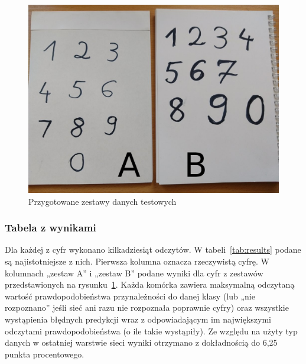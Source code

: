\documentclass[12pt, oneside, a4paper]{article}
\begin{document}
\begin{figure}[h]
  \centering
  \includegraphics[width=0.9\linewidth]{figures/test_data.jpg}
  \caption{Przygotowane zestawy danych testowych}\label{fig:test_data}
\end{figure}


\subsubsection{Tabela z wynikami}
Dla każdej z cyfr wykonano kilkadziesiąt odczytów. W tabeli~\ref{tab:results}
podane są najistotniejsze z nich.
Pierwsza kolumna oznacza rzeczywistą cyfrę. W kolumnach „zestaw A” i „zestaw B”
podane wyniki dla cyfr z zestawów przedstawionych
na rysunku~\ref{fig:test_data}.
Każda komórka zawiera maksymalną odczytaną wartość prawdopodobieństwa
przynależności do danej klasy (lub „nie rozpoznano” jeśli sieć ani razu
nie rozpoznała poprawnie cyfry)
oraz wszystkie wystąpienia błędnych predykcji wraz z odpowiadającym im
największymi odczytami prawdopodobieństwa (o ile takie wystąpiły).
Ze względu na użyty typ danych w ostatniej warstwie sieci
wyniki otrzymano z dokładnością do 6,25 punkta procentowego.
\end{document}
